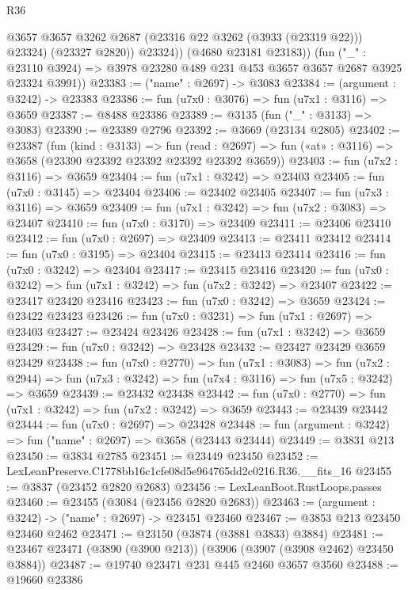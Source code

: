 \begin{lexlean}{R36}
\begin{coremodule}
                @3657
                @3657
                @3262
                @2687
                (@23316 @22 @3262 (@3933 (@23319 @22)))
                @23324)
              (@23327 @2820))
            @23324))
        (@4680 @23181 @23183))
      (fun ("_" : @23110 @3924) =>
      @3978 @23280 @489 @231 @453 @3657 @3657 @2687 @3925 @23324 @3991))
@23383 := ("name" : @2697) -> @3083
@23384 := (argument : @3242) -> @23383
@23386 := fun (u7x0 : @3076) => fun (u7x1 : @3116) => @3659
@23387 := @8488 @23386
@23389 := @3135 (fun ("_" : @3133) => @3083)
@23390 := @23389 @2796
@23392 := @3669 (@23134 @2805)
@23402 := @23387
    (fun (kind : @3133) =>
    fun (read : @2697) => fun («at» : @3116) => @3658 (@23390 @23392 @23392 @23392 @23392 @3659))
@23403 := fun (u7x2 : @3116) => @3659
@23404 := fun (u7x1 : @3242) => @23403
@23405 := fun (u7x0 : @3145) => @23404
@23406 := @23402 @23405
@23407 := fun (u7x3 : @3116) => @3659
@23409 := fun (u7x1 : @3242) => fun (u7x2 : @3083) => @23407
@23410 := fun (u7x0 : @3170) => @23409
@23411 := @23406 @23410
@23412 := fun (u7x0 : @2697) => @23409
@23413 := @23411 @23412
@23414 := fun (u7x0 : @3195) => @23404
@23415 := @23413 @23414
@23416 := fun (u7x0 : @3242) => @23404
@23417 := @23415 @23416
@23420 := fun (u7x0 : @3242) => fun (u7x1 : @3242) => fun (u7x2 : @3242) => @23407
@23422 := @23417 @23420 @23416
@23423 := fun (u7x0 : @3242) => @3659
@23424 := @23422 @23423
@23426 := fun (u7x0 : @3231) => fun (u7x1 : @2697) => @23403
@23427 := @23424 @23426
@23428 := fun (u7x1 : @3242) => @3659
@23429 := fun (u7x0 : @3242) => @23428
@23432 := @23427 @23429 @3659 @23429
@23438 := fun (u7x0 : @2770) =>
  fun (u7x1 : @3083) =>
  fun (u7x2 : @2944) => fun (u7x3 : @3242) => fun (u7x4 : @3116) => fun (u7x5 : @3242) => @3659
@23439 := @23432 @23438
@23442 := fun (u7x0 : @2770) => fun (u7x1 : @3242) => fun (u7x2 : @3242) => @3659
@23443 := @23439 @23442
@23444 := fun (u7x0 : @2697) => @23428
@23448 := fun (argument : @3242) => fun ("name" : @2697) => @3658 (@23443 @23444)
@23449 := @3831 @213
@23450 := @3834 @2785
@23451 := @23449 @23450
@23452 := LexLeanPreserve.C1778bb16c1cfe08d5e964765dd2c0216.R36.__fits_16
@23455 := @3837 (@23452 @2820 @2683)
@23456 := LexLeanBoot.RustLoops.passes
@23460 := @23455 (@3084 (@23456 @2820 @2683))
@23463 := (argument : @3242) -> ("name" : @2697) -> @23451 @23460
@23467 := @3853 @213 @23450 @23460 @2462
@23471 := @23150 (@3874 (@3881 @3833) @3884)
@23481 := @23467 @23471 (@3890 (@3900 @213)) (@3906 (@3907 (@3908 @2462) @23450 @3884))
@23487 := @19740 @23471 @231 @445 @2460 @3657 @3560
@23488 := @19660 @23386

\end{coremodule}
\end{lexlean}

